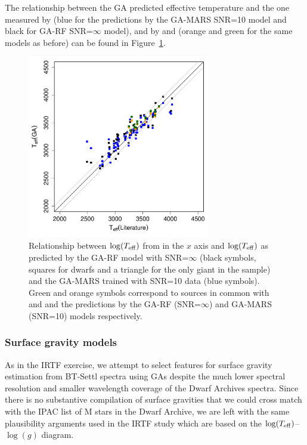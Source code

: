 The relationship between the GA predicted effective temperature and
the one measured by \cite{RA2012} (blue for the predictions by the
GA-MARS SNR=10 model and black for GA-RF SNR=$\infty$ model), and
by \cite{esm1} and \cite{esm2} (orange and green for
the same models as before) can be found in
Figure~\ref{fig:ipac_lt_lt}.

\begin{figure}
 \begin{center} \includegraphics[width=8cm]{figs/ipac_LG_Trojas_Tknn_10}

\caption{Relationship  between $\log(T_{\rm eff})$ from \protect\cite{RA2012}
in the $x$ axis and $\log(T_{\rm eff})$ as predicted by the GA-RF
 model with SNR=$\infty$ (black symbols, squares for dwarfs and a
 triangle for the only giant in the sample) and the GA-MARS trained
 with SNR=10 data (blue symbols). Green and orange symbols correspond
 to sources in common with \protect\cite{esm1}
 and \protect\cite{esm2} and the predictions by the
 GA-RF (SNR=$\infty$) and GA-MARS (SNR=10) models
 respectively.} \label{fig:ipac_lt_lt} \end{center}
\end{figure}



\subsubsection{Surface gravity models}

As in the IRTF exercise, we attempt to select features for surface
gravity estimation from BT-Settl spectra using GAs despite the much
lower spectral resolution and smaller wavelength coverage of the Dwarf Archives
spectra. Since there is no substantive compilation of surface
gravities that we could cross match with the IPAC list of M stars in
the Dwarf Archive, we are left with the same plausibility arguments
used in the IRTF study which are based on the $\log(T_{\rm
eff})$--$\log(g)$ diagram.

